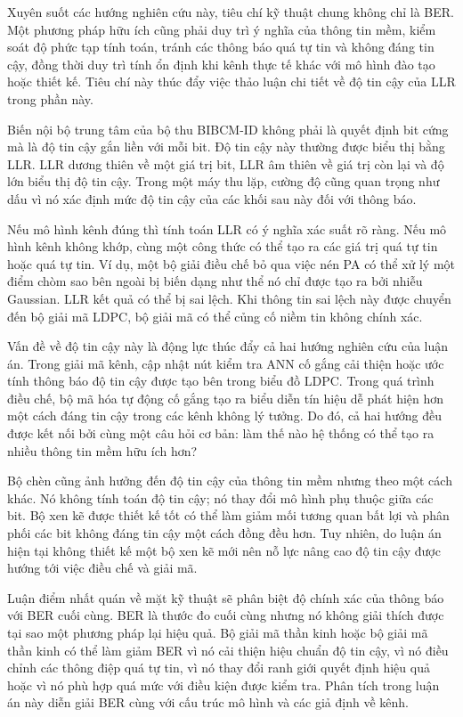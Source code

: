 Xuyên suốt các hướng nghiên cứu này, tiêu chí kỹ thuật chung không chỉ là BER. Một phương pháp hữu ích cũng phải duy trì ý nghĩa của thông tin mềm, kiểm soát độ phức tạp tính toán, tránh các thông báo quá tự tin và không đáng tin cậy, đồng thời duy trì tính ổn định khi kênh thực tế khác với mô hình đào tạo hoặc thiết kế. Tiêu chí này thúc đẩy việc thảo luận chi tiết về độ tin cậy của LLR trong phần này.

Biến nội bộ trung tâm của bộ thu BIBCM-ID không phải là quyết định bit cứng mà là độ tin cậy gắn liền với mỗi bit. Độ tin cậy này thường được biểu thị bằng LLR. LLR dương thiên về một giá trị bit, LLR âm thiên về giá trị còn lại và độ lớn biểu thị độ tin cậy. Trong một máy thu lặp, cường độ cũng quan trọng như dấu vì nó xác định mức độ tin cậy của các khối sau này đối với thông báo.

Nếu mô hình kênh đúng thì tính toán LLR có ý nghĩa xác suất rõ ràng. Nếu mô hình kênh không khớp, cùng một công thức có thể tạo ra các giá trị quá tự tin hoặc quá tự tin. Ví dụ, một bộ giải điều chế bỏ qua việc nén PA có thể xử lý một điểm chòm sao bên ngoài bị biến dạng như thể nó chỉ được tạo ra bởi nhiễu Gaussian. LLR kết quả có thể bị sai lệch. Khi thông tin sai lệch này được chuyển đến bộ giải mã LDPC, bộ giải mã có thể củng cố niềm tin không chính xác.

Vấn đề về độ tin cậy này là động lực thúc đẩy cả hai hướng nghiên cứu của luận án. Trong giải mã kênh, cập nhật nút kiểm tra ANN cố gắng cải thiện hoặc ước tính thông báo độ tin cậy được tạo bên trong biểu đồ LDPC. Trong quá trình điều chế, bộ mã hóa tự động cố gắng tạo ra biểu diễn tín hiệu dễ phát hiện hơn một cách đáng tin cậy trong các kênh không lý tưởng. Do đó, cả hai hướng đều được kết nối bởi cùng một câu hỏi cơ bản: làm thế nào hệ thống có thể tạo ra nhiều thông tin mềm hữu ích hơn?

Bộ chèn cũng ảnh hưởng đến độ tin cậy của thông tin mềm nhưng theo một cách khác. Nó không tính toán độ tin cậy; nó thay đổi mô hình phụ thuộc giữa các bit. Bộ xen kẽ được thiết kế tốt có thể làm giảm mối tương quan bất lợi và phân phối các bit không đáng tin cậy một cách đồng đều hơn. Tuy nhiên, do luận án hiện tại không thiết kế một bộ xen kẽ mới nên nỗ lực nâng cao độ tin cậy được hướng tới việc điều chế và giải mã.

Luận điểm nhất quán về mặt kỹ thuật sẽ phân biệt độ chính xác của thông báo với BER cuối cùng. BER là thước đo cuối cùng nhưng nó không giải thích được tại sao một phương pháp lại hiệu quả. Bộ giải mã thần kinh hoặc bộ giải mã thần kinh có thể làm giảm BER vì nó cải thiện hiệu chuẩn độ tin cậy, vì nó điều chỉnh các thông điệp quá tự tin, vì nó thay đổi ranh giới quyết định hiệu quả hoặc vì nó phù hợp quá mức với điều kiện được kiểm tra. Phân tích trong luận án này diễn giải BER cùng với cấu trúc mô hình và các giả định về kênh.


